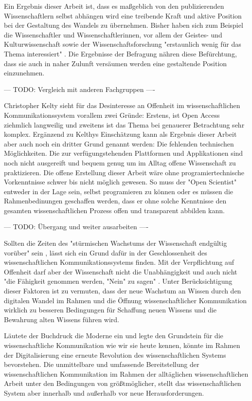 Ein Ergebnis dieser Arbeit ist, dass es maßgeblich von den publizierenden Wissenschaftlern selbst abhängen wird eine treibende Kraft und aktive Position bei der Gestaltung des Wandels zu übernehmen. Bisher haben sich zum Beispiel die Wissenschaftler und Wissenschaftlerinnen, vor allem der Geistes- und Kulturwissenschaft sowie der Wissenschaftsforschung "erstaunlich wenig für das Thema interessiert" \cite{hagner_2015_sache_buches}. Die Ergebnisse der Befragung nähren diese Befürchtung, dass sie auch in naher Zulunft versäumen werden eine gestaltende Position einzunehmen.

--- TODO: Vergleich mit anderen Fachgruppen ----

Christopher Kelty sieht für das Desinteresse an Offenheit im wissenschaftlichen Kommunikationssystem vorallem zwei Gründe: Erstens, ist Open Access ziehmlich langweilig und zweitens ist das Thema bei genauerer Betrachtung sehr komplex. Ergänzend zu Kelthys Einschätzung kann als Ergebnis dieser Arbeit aber auch noch ein dritter Grund genannt werden: Die fehlenden technischen Möglichkeiten. Die zur verfügungstehenden Plattformen und Applikationen sind noch nicht ausgereift und bequem genug um im Alltag offene Wissenschaft zu praktizieren. Die offene Erstellung dieser Arbeit wäre ohne programiertechnische Vorkenntnisse schwer bis nicht möglich gewesen. So muss der "Open Scientist" entweder in der Lage sein, selbst programieren zu können oder es müssen die Rahmenbedinungen geschaffen werden, dass er ohne solche Kenntnisse den gesamten wissenschaftlichen Prozess offen und transparent abbilden kann.

--- TODO: Übergang und weiter ausarbeiten ----

Sollten die Zeiten des "stürmischen Wachstums der Wissenschaft endgültig vorüber" sein \cite{K_lbel_2002}, lässt sich ein Grund dafür in der Geschlossenheit des wissenschaftlichen Kommunikationssystems finden. Mit der Verpflichtung auf Offenheit darf aber der Wissenschaft nicht die Unabhängigkeit und auch nicht "die Fähigkeit genommen werden, "Nein" zu sagen" \cite{suchen_Hornbostel_2006}. Unter Berücksichtigung dieser Faktoren ist zu vermuten, dass der neue Wachstum an Wissen durch den digitalen Wandel im Rahmen und die Öffnung wissenschaftlicher Kommunikation wirklich zu besseren Bedingungen für Schaffung neuen Wissens und die Bewahrung alten Wissens führen wird.

Läutete der Buchdruck die Moderne ein und legte den Grundstein für die wissenschaftliche Kommunikation wie wir sie heute kennen, könnte im Rahmen der Digitalisierung eine erneute Revolution des wissenschaftlichen Systems bevorstehen. Die unmittelbare und umfassende Bereitstellung der wissenschaftlichen Kommunikation im Rahmen der alltäglichen wissenschaftlichen Arbeit unter den Bedingungen von größtmöglicher, stellt das wissenschaftlichen System aber innerhalb und außerhalb vor neue Herausforderungen.


